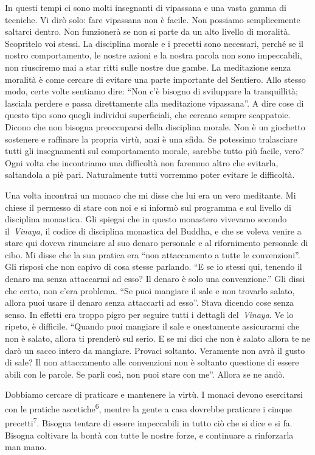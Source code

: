 In questi tempi ci sono molti insegnanti di vipassana e una vasta gamma
di tecniche. Vi dirò solo: fare vipassana non è facile. Non possiamo
semplicemente saltarci dentro. Non funzionerà se non si parte da un alto
livello di moralità. Scopritelo voi stessi. La disciplina morale e i
precetti sono necessari, perché se il nostro comportamento, le nostre
azioni e la nostra parola non sono impeccabili, non riusciremo mai a
star ritti sulle nostre due gambe. La meditazione senza moralità è come
cercare di evitare una parte importante del Sentiero. Allo stesso modo,
certe volte sentiamo dire: ``Non c'è bisogno di sviluppare la
tranquillità; lasciala perdere e passa direttamente alla meditazione
vipassana''. A dire cose di questo tipo sono quegli individui
superficiali, che cercano sempre scappatoie. Dicono che non bisogna
preoccuparsi della disciplina morale. Non è un giochetto sostenere e
raffinare la propria virtù, anzi è una sfida. Se potessimo tralasciare
tutti gli insegnamenti sul comportamento morale, sarebbe tutto più
facile, vero? Ogni volta che incontriamo una difficoltà non faremmo
altro che evitarla, saltandola a piè pari. Naturalmente tutti vorremmo
poter evitare le difficoltà.

Una volta incontrai un monaco che mi disse che lui era un vero
meditante. Mi chiese il permesso di stare con noi e si informò sul
programma e sul livello di disciplina monastica. Gli spiegai che in
questo monastero vivevamo secondo il~\emph{Vinaya}, il codice di
disciplina monastica del Buddha, e che se voleva venire a stare qui
doveva rinunciare al suo denaro personale e al rifornimento personale di
cibo. Mi disse che la sua pratica era ``non attaccamento a tutte le
convenzioni''. Gli risposi che non capivo di cosa stesse parlando. ``E
se io stessi qui, tenendo il denaro ma senza attaccarmi ad esso? Il
denaro è solo una convenzione.'' Gli dissi che certo, non c'era
problema. ``Se puoi mangiare il sale e non trovarlo salato, allora puoi
usare il denaro senza attaccarti ad esso''. Stava dicendo cose senza
senso. In effetti era troppo pigro per seguire tutti i dettagli
del~\emph{Vinaya}. Ve lo ripeto, è difficile. ``Quando puoi mangiare il
sale e onestamente assicurarmi che non è salato, allora ti prenderò sul
serio. E se mi dici che non è salato allora te ne darò un sacco intero
da mangiare. Provaci soltanto. Veramente non avrà il gusto di sale? Il
non attaccamento alle convenzioni non è soltanto questione di essere
abili con le parole. Se parli così, non puoi stare con me''. Allora se
ne andò.

Dobbiamo cercare di praticare e mantenere la virtù. I monaci devono
esercitarsi con le pratiche ascetiche\textsuperscript{6}, mentre la
gente a casa dovrebbe praticare i cinque precetti\textsuperscript{7}.
Bisogna tentare di essere impeccabili in tutto ciò che si dice e si fa.
Bisogna coltivare la bontà con tutte le nostre forze, e continuare a
rinforzarla man mano.

